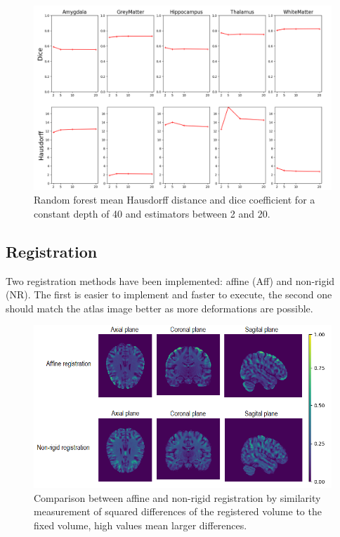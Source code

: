 \begin{figure}[h!]
	\centering
	\includegraphics[width=\linewidth]{img/plotMLOptEstimator2}
	\caption{Random forest  mean Hausdorff distance and dice coefficient for a constant depth of 40 and estimators between 2 and 20.}
	\label{fig:MLOptEst}
\end{figure}

\subsection*{Registration}
Two registration methods have been implemented: affine (Aff) and non-rigid (NR). The first is easier to implement and faster to execute, the second one should match the atlas image better as more deformations are possible.

\begin{figure}[h!]
	\centering
	\includegraphics[width=\linewidth]{img/compareRegistration2}
	\caption{Comparison between affine and non-rigid registration by similarity measurement of squared differences of the registered volume to the fixed volume, high values mean larger differences.}
	\label{fig:compareregistration}
\end{figure}

